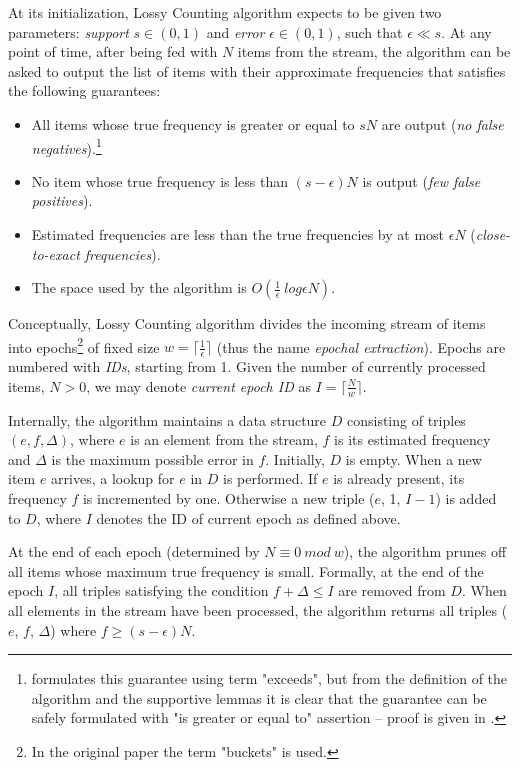 At its initialization, Lossy Counting algorithm expects to be given two parameters:
\emph{support} $s \in (0,1)$ and \emph{error} $\epsilon \in (0,1)$, such
that $\epsilon \ll s$.
At any point of time, after being fed with $N$ items from the stream,
the algorithm can be asked to output the list of items with their approximate
frequencies that satisfies the following guarantees:
\begin{itemize}
 \item All items whose true frequency is greater or equal to $sN$ are output
  (\emph{no false negatives}).\footnote{\citet{manku:lossycounting} formulates this
    guarantee using term "exceeds", but from the definition of the algorithm and
    the supportive lemmas it is clear that the guarantee can be safely formulated with
    "is greater or equal to" assertion -- proof is given in .}
 \item No item whose true frequency is less than $(s - \epsilon)N$ is output
  (\emph{few false positives}).
 \item Estimated frequencies are less than the true frequencies by at most
  $\epsilon N$ (\emph{close-to-exact frequencies}).
 \item The space used by the algorithm is $O(\frac{1}{\epsilon}~log \epsilon N)$.
\end{itemize}

Conceptually, Lossy Counting algorithm divides the incoming stream of items
into epochs\footnote{In the original paper the term "buckets" is used.}
of fixed size $w = \lceil \frac{1}{\epsilon} \rceil$
(thus the name \emph{epochal extraction}).
Epochs are numbered with \emph{IDs}, starting from 1.
Given the number of currently processed items, $N > 0$, we may denote
\emph{current epoch ID} as $I = \lceil \frac{N}{w} \rceil$.

Internally, the algorithm maintains a data structure $D$ consisting of triples
$(e, f, \Delta)$, where $e$ is an element from the stream, $f$ is its estimated
frequency and $\Delta$ is the maximum possible error in $f$.
Initially, $D$ is empty.
When a new item $e$ arrives, a lookup for $e$ in $D$ is performed.
If $e$ is already present, its frequency $f$ is incremented by one.
Otherwise a new triple ($e$, 1, $I-1$) is added to $D$,
where $I$ denotes the ID of current epoch as defined above.

At the end of each epoch (determined by $N \equiv 0~mod~w$), the algorithm
prunes off all items whose maximum true frequency is small.
Formally, at the end of the epoch $I$, all triples satisfying the condition
$f + \Delta \leq I$ are removed from $D$.
When all elements in the stream have been processed, the algorithm returns all
triples ($e$, $f$, $\Delta$) where $f \geq (s-\epsilon)N$.

